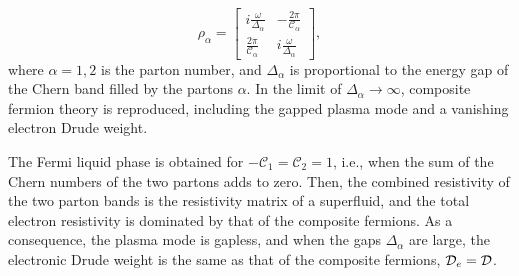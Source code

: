 \documentclass[aps,prl,twocolumn,superscriptaddress,floatfix, 10pt,longbibliography, nofootinbib]{revtex4-2}
\begin{document}
\begin{equation}
   \rho_{\alpha}=\begin{bmatrix}
    i\frac{ \omega}{ \Delta_{\alpha}} & -\frac{2 \pi}{\mathcal{C}_{\alpha}}\\
    \frac{2 \pi}{\mathcal{C}_{\alpha}} & i\frac{\omega}{ \Delta_{\alpha}}
\end{bmatrix},
\label{rhoi}
\end{equation} where $\alpha=1,2$ is the parton number, and $\Delta_{\alpha}$ is proportional to the energy gap of the Chern band filled by the partons $\alpha$. In the limit of $\Delta_{\alpha}\rightarrow\infty$, composite fermion theory is reproduced, including the gapped plasma mode and a vanishing electron Drude weight.

The Fermi liquid phase is obtained for $-\mathcal{C}_1=\mathcal{C}_2=1$, i.e., when the sum of the Chern numbers of the two partons adds to zero. Then, the combined resistivity of the two parton bands is the resistivity matrix of a superfluid, and the total electron resistivity is dominated by that of the composite fermions. As a consequence, the plasma mode is gapless, and when the gaps $\Delta_\alpha$ are large, the electronic Drude weight is the same as that of the composite fermions, ${\cal D}_e = {\cal D}$.
\end{document}
